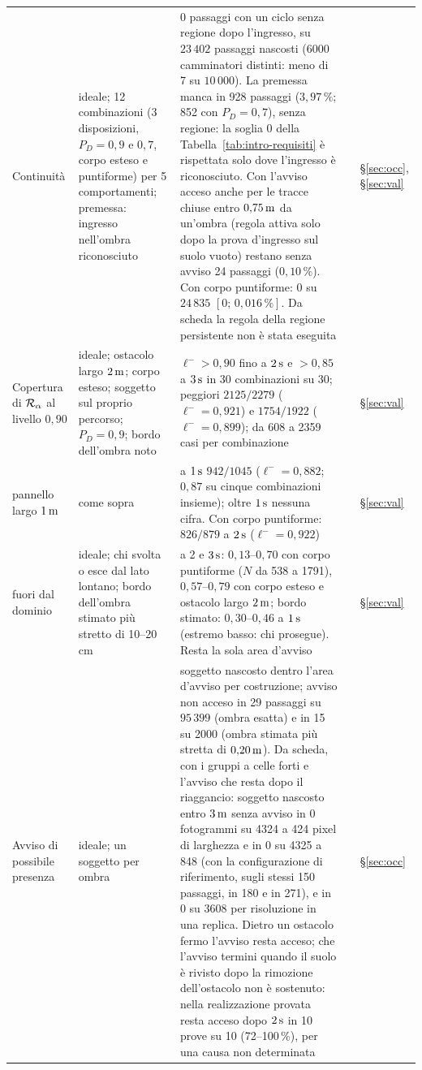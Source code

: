 \begin{table}[p]
\begin{tabularx}{\textwidth}{@{}>{\RaggedRight\arraybackslash}p{2.8cm}>{\RaggedRight\arraybackslash}p{4.1cm}L>{\RaggedRight\arraybackslash}p{1.2cm}>{\RaggedRight\arraybackslash}p{1.05cm}@{}}
Continuità & ideale; 12 combinazioni (3 disposizioni, $P_D=0{,}9$ e $0{,}7$, corpo esteso e puntiforme) per 5 comportamenti; premessa: ingresso nell'ombra riconosciuto & 0 passaggi con un ciclo senza regione dopo l'ingresso, su $23\,402$ passaggi nascosti (6000 camminatori distinti: meno di 7 su $10\,000$). La premessa manca in 928 passaggi ($3{,}97\,\%$; 852 con $P_D=0{,}7$), senza regione: la soglia 0 della Tabella~\ref{tab:intro-requisiti} è rispettata solo dove l'ingresso è riconosciuto. Con l'avviso acceso anche per le tracce chiuse entro $0{,}75\,\mathrm{m}$ da un'ombra (regola attiva solo dopo la prova d'ingresso sul suolo vuoto) restano senza avviso 24 passaggi ($0{,}10\,\%$). Con corpo puntiforme: 0 su $24\,835$ $[0;\,0{,}016\,\%]$. Da scheda la regola della regione persistente non è stata eseguita &  & \S\ref{sec:occ}, \S\ref{sec:val}\\
Copertura di $\mathcal{R}_\alpha$ al livello $0{,}90$ & ideale; ostacolo largo $2\,\mathrm{m}$; corpo esteso; soggetto sul proprio percorso; $P_D=0{,}9$; bordo dell'ombra noto & $\ell^->0{,}90$ fino a $2\,\mathrm{s}$ e $>0{,}85$ a $3\,\mathrm{s}$ in 30 combinazioni su 30; peggiori $2125/2279$ ($\ell^-=0{,}921$) e $1754/1922$ ($\ell^-=0{,}899$); da 608 a 2359 casi per combinazione &  & \S\ref{sec:val}\\
\quad pannello largo $1\,\mathrm{m}$ & come sopra & a $1\,\mathrm{s}$ $942/1045$ ($\ell^-=0{,}882$; $0{,}87$ su cinque combinazioni insieme); oltre $1\,\mathrm{s}$ nessuna cifra. Con corpo puntiforme: $826/879$ a $2\,\mathrm{s}$ ($\ell^-=0{,}922$) &  & \S\ref{sec:val}\\
\quad fuori dal dominio & ideale; chi svolta o esce dal lato lontano; bordo dell'ombra stimato più stretto di 10--20\,cm & a 2 e $3\,\mathrm{s}$: $0{,}13$--$0{,}70$ con corpo puntiforme ($N$ da 538 a 1791), $0{,}57$--$0{,}79$ con corpo esteso e ostacolo largo $2\,\mathrm{m}$; bordo stimato: $0{,}30$--$0{,}46$ a $1\,\mathrm{s}$ (estremo basso: chi prosegue). Resta la sola area d'avviso &  & \S\ref{sec:val}\\
Avviso di possibile presenza & ideale; un soggetto per ombra & soggetto nascosto dentro l'area d'avviso per costruzione; avviso non acceso in 29 passaggi su $95\,399$ (ombra esatta) e in 15 su 2000 (ombra stimata più stretta di $0{,}20\,\mathrm{m}$). Da scheda, con i gruppi a celle forti e l'avviso che resta dopo il riaggancio: soggetto nascosto entro $3\,\mathrm{m}$ senza avviso in 0 fotogrammi su 4324 a 424 pixel di larghezza e in 0 su 4325 a 848 (con la configurazione di riferimento, sugli stessi 150 passaggi, in 180 e in 271), e in 0 su 3608 per risoluzione in una replica. Dietro un ostacolo fermo l'avviso resta acceso; che l'avviso termini quando il suolo è rivisto dopo la rimozione dell'ostacolo non è sostenuto: nella realizzazione provata resta acceso dopo $2\,\mathrm{s}$ in 10 prove su 10 (72--100\,\%), per una causa non determinata &  & \S\ref{sec:occ}\\

\end{tabularx}
\end{table}
